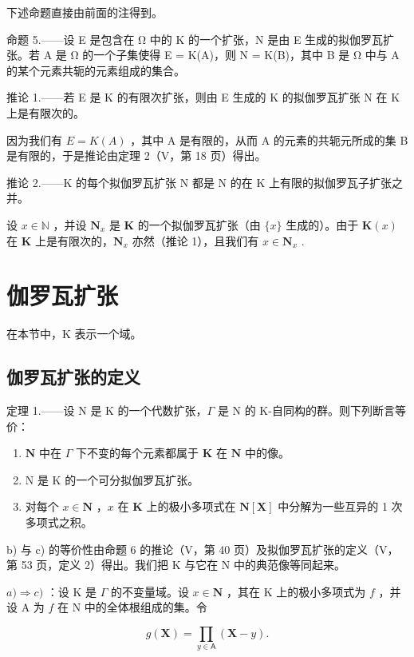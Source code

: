 下述命题直接由前面的注得到。

命题 5.——设 E 是包含在 Ω 中的 K 的一个扩张，N 是由 E 生成的拟伽罗瓦扩张。若 A 是 Ω 的一个子集使得 E = K(A)，则 N = K(B)，其中 B 是 Ω 中与 A 的某个元素共轭的元素组成的集合。

推论 1.——若 E 是 K 的有限次扩张，则由 E 生成的 K 的拟伽罗瓦扩张 N 在 K 上是有限次的。

因为我们有 \(E = K(A)\) ，其中 A 是有限的，从而 A 的元素的共轭元所成的集 B 是有限的，于是推论由定理 2（V，第 18 页）得出。

推论 2.——K 的每个拟伽罗瓦扩张 N 都是 N 的在 K 上有限的拟伽罗瓦子扩张之并。

设 \(x \in \mathbb{N}\) ，并设 \(\mathbf{N}_x\) 是 \(\mathbf{K}\) 的一个拟伽罗瓦扩张（由 \(\{x\}\) 生成的）。由于 \(\mathbf{K}(x)\) 在 \(\mathbf{K}\) 上是有限次的，\(\mathbf{N}_x\) 亦然（推论 1），且我们有 \(x \in \mathbf{N}_x\) .

\section{伽罗瓦扩张}

在本节中，K 表示一个域。

\subsection{伽罗瓦扩张的定义}

定理 1.——设 N 是 K 的一个代数扩张，\(\Gamma\) 是 N 的 K-自同构的群。则下列断言等价：

\begin{enumerate}
\def\labelenumi{\alph{enumi})}
\item
  \(\mathbf{N}\) 中在 \(\Gamma\) 下不变的每个元素都属于 \(\mathbf{K}\) 在 \(\mathbf{N}\) 中的像。
\item
  N 是 K 的一个可分拟伽罗瓦扩张。
\item
  对每个 \(x \in \mathbf{N}\) ，\(x\) 在 \(\mathbf{K}\) 上的极小多项式在 \(\mathbf{N}[\mathbf{X}]\) 中分解为一些互异的 1 次多项式之积。
\end{enumerate}

b) 与 c) 的等价性由命题 6 的推论（V，第 40 页）及拟伽罗瓦扩张的定义（V，第 53 页，定义 2）得出。我们把 K 与它在 N 中的典范像等同起来。

\(a) \Rightarrow c)\) ：设 K 是 \(\Gamma\) 的不变量域。设 \(x \in \mathbf{N}\) ，其在 K 上的极小多项式为 \(f\) ，并设 A 为 \(f\) 在 N 中的全体根组成的集。令

\[
g (\mathbf {X}) = \prod_ {y \in \mathsf {A}} (\mathbf {X} - y).
\]

